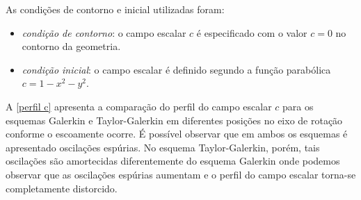 \medskip
\noindent
As condições de contorno e inicial utilizadas foram:

\begin{itemize}
     \item \textit{condição de contorno}: o campo escalar $c$ é especificado
      com o valor $c=0$ no contorno da geometria.

     \item \textit{condição inicial}: o campo escalar é definido segundo
      a função parabólica $c = 1 - x^2 - y^2$.
\end{itemize}

\medskip
A \ref{perfil c} apresenta a comparação do perfil do campo escalar $c$ para os esquemas Galerkin e
Taylor-Galerkin em diferentes posições no eixo de rotação conforme o escoamente ocorre. É possível observar que em ambos
os esquemas é apresentado oscilações espúrias. No esquema Taylor-Galerkin, porém, tais
oscilações são amortecidas diferentemente do esquema Galerkin onde podemos observar que
as oscilações espúrias aumentam e o perfil do campo escalar torna-se completamente distorcido. 

